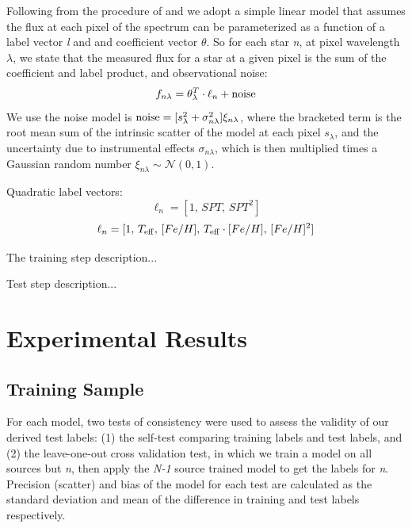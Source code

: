 \documentclass[preprint]{aastex62}
\begin{document}
Following from the procedure of \citealt{Ness:2015} and \citealt{Ho:2017a} we adopt a simple linear model that assumes the flux at each pixel of the spectrum can be parameterized as a function of a label vector \emph{l} and and coefficient vector \emph{$\theta$}. So for each star \emph{n}, at pixel wavelength \emph{$\lambda$}, we state that the measured flux for a star at a given pixel is the sum of the coefficient and label product, and observational noise:
\begin{equation}
	f_{n\lambda} = \theta_{\lambda}^{T} \cdot \ell_{n} + {\rm noise}
\end{equation}
We use the noise model is ${\rm noise}=[s_{\lambda}^2 + \sigma_{n\lambda}^2]\xi_{n\lambda}$, where the bracketed term is the root mean sum of the intrinsic scatter of the model at each pixel \emph{$s_{\lambda}$}, and the uncertainty due to instrumental effects \emph{$\sigma_{n\lambda}$}, which is then multiplied times a Gaussian random number $\xi_{n\lambda} \sim \mathcal{N} (0,1)$. 

Quadratic label vectors:
	\[\ell_{n} = [1, \, SPT, \, SPT^{2}] \]
	\[\ell_{n} = [1, \, T_{\rm eff}, \, [Fe/H], \, T_{\rm eff} \cdot [Fe/H], \, [Fe/H]^{2}] \]

The training step description...

Test step description...


\section{Experimental Results} \label{sec:results}

\subsection{Training Sample}

For each model, two tests of consistency were used to assess the validity of our derived test labels: (1) the self-test comparing training labels and test labels, and (2) the leave-one-out cross validation test, in which we train a model on all sources but \emph{n}, then apply the \emph{N-1} source trained model to get the labels for \emph{n}. Precision (scatter) and bias of the model for each test are calculated as the standard deviation and mean of the difference in training and test labels respectively.
\end{document}
